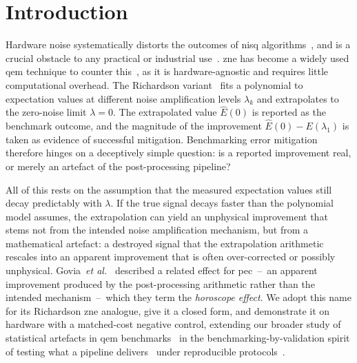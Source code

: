 \documentclass[10pt,conference, letterpaper]{IEEEtran}
\newcommand{\etal}{\emph{et al.}\xspace}
\begin{document}
\section{Introduction}
\label{sec:intro}
Hardware noise systematically distorts the outcomes of \gls{nisq} algorithms~\cite{greiwe_effects_2023,thelen_approximating_2024}, and is a crucial obstacle to any practical or industrial use~\cite{carbonelli_challenges_2024}. \gls{zne} has become a widely used \gls{qem} technique to counter this~\cite{temme_error_2017,li_efficient_2017,endo_practical_2018,cai_quantum_2023}, as it is hardware-agnostic and requires little computational overhead. The Richardson variant~\cite{temme_error_2017,endo_practical_2018, giurgica-tiron_digital_2020, krebsbach_optimization_2022} fits a polynomial to expectation values at different noise amplification levels $\lambda_k$ and extrapolates to the zero-noise limit $\lambda=0$. The extrapolated value $\hat{E}(0)$ is reported as the benchmark outcome, and the magnitude of the improvement $\hat{E}(0)-E(\lambda_1)$ is taken as evidence of successful mitigation. Benchmarking error mitigation therefore hinges on a deceptively simple question: is a reported improvement real, or merely an artefact of the post-processing pipeline?

All of this rests on the assumption that the measured expectation values still decay predictably with $\lambda$. If the true signal decays faster than the polynomial model assumes, the extrapolation can yield an unphysical improvement that stems not from the intended noise amplification mechanism, but from a mathematical artefact: a destroyed signal that the extrapolation arithmetic rescales into an apparent improvement that is often over-corrected or possibly unphysical. Govia~\etal~\cite{govia_bounding_2025} described a related effect for \gls{pec}~--~an apparent improvement produced by the post-processing arithmetic rather than the intended mechanism~--~which they term the \emph{horoscope effect}. We adopt this name for its Richardson \gls{zne} analogue, give it a closed form, and demonstrate it on hardware with a matched-cost negative control, extending our broader study of statistical artefacts in \gls{qem} benchmarks~\cite{koester_claim_2026} in the benchmarking-by-validation spirit of testing what a pipeline delivers~\cite{russo_testing_2023} under reproducible protocols~\cite{mauerer_repro_2022}.
\end{document}
